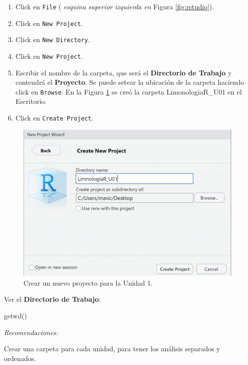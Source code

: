 \documentclass[
]{book}
\newenvironment{Shaded}{\begin{snugshade}}{\end{snugshade}}
\newcommand{\FunctionTok}[1]{\textcolor[rgb]{0.00,0.00,0.00}{#1}}
\newcommand{\NormalTok}[1]{#1}
\providecommand{\tightlist}{%
  \setlength{\itemsep}{0pt}\setlength{\parskip}{0pt}}
\begin{document}
\begin{enumerate}
\def\labelenumi{\arabic{enumi}.}
\tightlist
\item
  Click en \texttt{File} ( \emph{esquina superior izquierda en} Figura \ref{fig:rstudio}).
\item
  Click en \texttt{New\ Project}.
\item
  Click en \texttt{New\ Directory}.
\item
  Click en \texttt{New\ Project}.
\item
  Escribir el nombre de la carpeta, que será el \textbf{Directorio de Trabajo} y contendrá el \textbf{Proyecto}. Se puede setear la ubicación de la carpeta haciendo click en \texttt{Browse}. En la Figura \ref{fig:project} se creó la carpeta LimonologiaR\_U01 en el Escritorio.
\item
  Click en \texttt{Create\ Project}.
\end{enumerate}

\begin{figure}

{\centering \includegraphics[width=0.75\linewidth]{./images/project} 

}

\caption{Crear un nuevo proyecto para la Unidad 1.}\label{fig:project}
\end{figure}

Ver el \textbf{Directorio de Trabajo}:

\begin{Shaded}
\begin{Highlighting}[]
\FunctionTok{getwd}\NormalTok{()}
\end{Highlighting}
\end{Shaded}

\emph{Recomendaciones:}

Crear una carpeta para cada unidad, para tener los análisis separados y ordenados.
\end{document}
